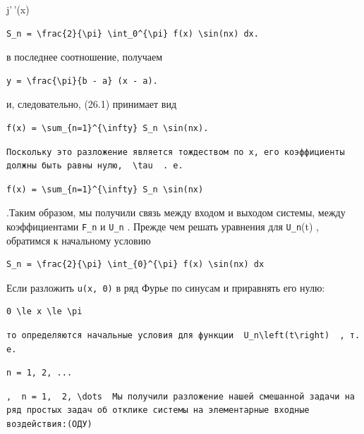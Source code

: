 \documentclass[
  ukrainian,
]{article}
\begin{document}
j'\,'(x)

\begin{verbatim}
S_n = \frac{2}{\pi} \int_0^{\pi} f(x) \sin(nx) dx.
\end{verbatim}

в последнее соотношение, получаем

\begin{verbatim}
y = \frac{\pi}{b - a} (x - a).
\end{verbatim}

и, следовательно, (26.1) принимает вид

\begin{verbatim}
f(x) = \sum_{n=1}^{\infty} S_n \sin(nx).
\end{verbatim}

\begin{verbatim}
Поскольку это разложение является тождеством по x, его коэффициенты должны быть равны нулю,  \tau  . е.
\end{verbatim}

\begin{verbatim}
f(x) = \sum_{n=1}^{\infty} S_n \sin(nx)
\end{verbatim}

.Таким образом, мы получили связь между входом и выходом системы, между
коэффициентами \texttt{F\_n} и \texttt{U\_n} . Прежде чем решать
уравнения для \texttt{U\_n}(t) , обратимся к начальному условию

\begin{verbatim}
S_n = \frac{2}{\pi} \int_{0}^{\pi} f(x) \sin(nx) dx
\end{verbatim}

Если разложить \texttt{u(x,\ 0)} в ряд Фурье по синусам и приравнять его
нулю:

\begin{verbatim}
0 \le x \le \pi
\end{verbatim}

\begin{verbatim}
то определяются начальные условия для функции  U_n\left(t\right)  , т. е.
\end{verbatim}

\begin{verbatim}
n = 1, 2, ...
\end{verbatim}

\begin{verbatim}
,  n = 1,  2, \dots  Мы получили разложение нашей смешанной задачи на ряд простых задач об отклике системы на элементарные входные воздействия:(OДУ)
\end{verbatim}
\end{document}
